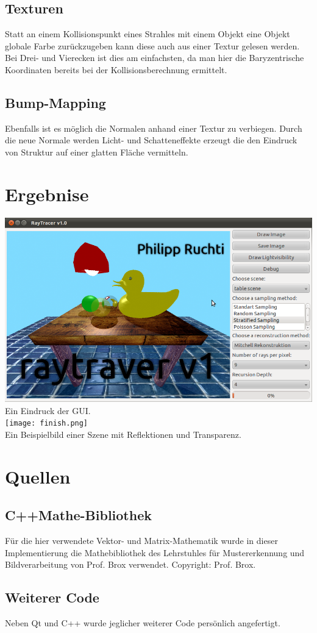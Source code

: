 \documentclass[a4paper]{article}
\begin{document}
\subsection*{Texturen}
Statt an einem Kollisionspunkt eines Strahles mit einem Objekt eine Objekt globale Farbe zurückzugeben kann diese auch aus einer Textur gelesen werden. Bei Drei- und Vierecken ist dies am einfachsten, da man hier die Baryzentrische Koordinaten bereits bei der Kollisionsberechnung ermittelt.

\subsection*{Bump-Mapping}
Ebenfalls ist es möglich die Normalen anhand einer Textur zu verbiegen. Durch die neue Normale werden Licht- und Schatteneffekte erzeugt die den Eindruck von Struktur auf einer glatten Fläche vermitteln.

\section*{Ergebnise}
\begin{center}
	\includegraphics[width=\textwidth]{Bildschirmfoto.png}\\
	Ein Eindruck der GUI.\\
	\vspace{20pt}
	\texttt{[image: finish.png]}\\
	Ein Beispielbild einer Szene mit Reflektionen und Transparenz.\\
\end{center}

\section*{Quellen}
\subsection*{C++Mathe-Bibliothek}
Für die hier verwendete Vektor- und Matrix-Mathematik wurde in dieser Implementierung die Mathebibliothek des Lehrstuhles für Mustererkennung und Bildverarbeitung von Prof. Brox verwendet. Copyright: Prof. Brox.

\subsection*{Weiterer Code}
Neben Qt und C++ wurde jeglicher weiterer Code persönlich angefertigt.
\end{document}
